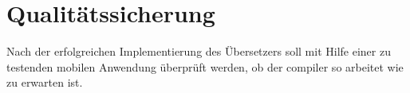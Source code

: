 \chapter{Qualitätssicherung}
\label{chap:Qualitätssicherung}

Nach der erfolgreichen Implementierung des Übersetzers soll mit Hilfe einer zu testenden mobilen Anwendung überprüft werden,  ob der compiler so arbeitet wie zu erwarten ist.  